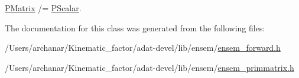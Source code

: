 \mbox{\hyperlink{classENSEM_1_1PMatrix}{P\+Matrix}} /= \mbox{\hyperlink{classENSEM_1_1PScalar}{P\+Scalar}}. 



The documentation for this class was generated from the following files\+:\begin{DoxyCompactItemize}
\item 
/\+Users/archanar/\+Kinematic\+\_\+factor/adat-\/devel/lib/ensem/\mbox{\hyperlink{adat-devel_2lib_2ensem_2ensem__forward_8h}{ensem\+\_\+forward.\+h}}\item 
/\+Users/archanar/\+Kinematic\+\_\+factor/adat-\/devel/lib/ensem/\mbox{\hyperlink{adat-devel_2lib_2ensem_2ensem__primmatrix_8h}{ensem\+\_\+primmatrix.\+h}}\end{DoxyCompactItemize}
